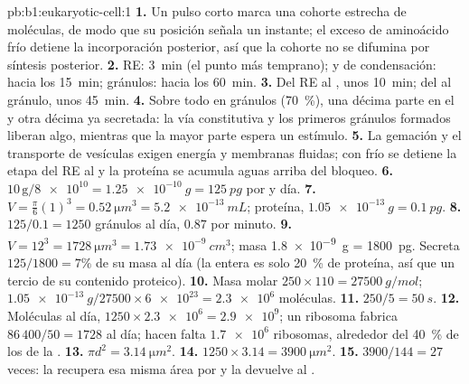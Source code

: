\begin{solution}{pb:b1:eukaryotic-cell:1}
\textbf{1.} Un pulso corto marca una cohorte estrecha de moléculas, de modo
que su posición señala un instante; el exceso de aminoácido frío detiene la
incorporación posterior, así que la cohorte no se difumina por síntesis
posterior.
\textbf{2.} RE: \qty{3}{min} (el punto más temprano);  y  de
condensación: hacia los \qty{15}{min}; gránulos: hacia los \qty{60}{min}.
\textbf{3.} Del RE al , unos \qty{10}{min}; del  al gránulo, unos
\qty{45}{min}.
\textbf{4.} Sobre todo en gránulos (\qty{70}{\%}), una décima parte en el
 y otra décima ya secretada: la vía constitutiva y los primeros
gránulos formados liberan algo, mientras que la mayor parte espera un
estímulo.
\textbf{5.} La gemación y el transporte de vesículas exigen energía y
membranas fluidas; con frío se detiene la etapa del RE al  y la
proteína se acumula aguas arriba del bloqueo.
\textbf{6.} $10\,\mathrm{g}/\num{8e10} = \qty{1.25e-10}{g} =
\qty{125}{pg}$ por  y día.
\textbf{7.} $V = \frac{\pi}{6}(1)^3 = \qty{0.52}{\micro m^3} =
\qty{5.2e-13}{mL}$; proteína, $\qty{1.05e-13}{g} = \qty{0.1}{pg}$.
\textbf{8.} $125/0.1 = 1250$ gránulos al día, $0.87$ por minuto.
\textbf{9.} $V = 12^3 = \qty{1728}{\micro m^3} = \qty{1.73e-9}{cm^3}$;
masa \qty{1.8e-9}{g} = \qty{1800}{pg}. Secreta $125/1800 = 7\%$ de su masa
al día (la  entera es solo \qty{20}{\%} de proteína, así que un tercio
de su contenido proteico).
\textbf{10.} Masa molar $250\times 110 = \qty{27500}{g/mol}$;
$\qty{1.05e-13}{g}/27500\times\num{6e23} = \num{2.3e6}$ moléculas.
\textbf{11.} $250/5 = \qty{50}{s}$.
\textbf{12.} Moléculas al día, $1250\times\num{2.3e6} = \num{2.9e9}$; un
ribosoma fabrica $86\,400/50 = 1728$ al día; hacen falta
$\num{1.7e6}$ ribosomas, alrededor del \qty{40}{\%} de los de la .
\textbf{13.} $\pi d^2 = \qty{3.14}{\micro m^2}$.
\textbf{14.} $1250\times 3.14 = \qty{3900}{\micro m^2}$.
\textbf{15.} $3900/144 = 27$ veces: la  recupera esa misma área por
 y la devuelve al .

\end{solution}
